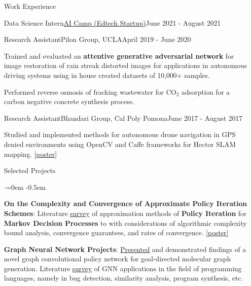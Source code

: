 \documentclass{resume}
\begin{document}
\begin{rSection}{Work Experience}
\begin{rSubsection}{Data Science Intern}{\href{https://www.ai-camp.org/}{AI Camp (Edtech Startup)}}{June 2021 - August 2021}
    \end{rSubsection}
    \begin{rSubsection}{Research Assistant}{Pilon Group, UCLA}{April 2019 - June 2020}
        \item Trained and evaluated an \textbf{attentive generative adversarial network} for image restoration of rain streak distorted
        images for applications in autonomous driving systems using in house created datasets of 10,000+ samples.
        \item Performed reverse osmosis of fracking wastewater for $\text{CO}_2$ adsorption for a carbon negative concrete synthesis process.
    \end{rSubsection}
    \begin{rSubsection}{Research Assistant}{\small Bhandari Group, Cal Poly Pomona}{June 2017 - August 2017}
        \item Studied and implemented methods for autonomous drone navigation in GPS denied environments using OpenCV and Caffe frameworks for Hector SLAM mapping.
        \href{https://docs.google.com/presentation/d/1fp-MPZUgKS_PhMD90d4aL0Rh0-YfghnEYHb3sHKmnGE/edit?usp=sharing}{[poster]}
    \end{rSubsection}
\end{rSection}

\begin{rSection}{Selected Projects}
    \vspace{0.5em}
    \begin{list}{$\cdot$}{\leftmargin=0em}
      \itemsep -0.5em \vspace{-0.5em}
        \item {\bf On the Complexity and Convergence of Approximate Policy Iteration Schemes}:
        Literature \href{https://github.com/joostinyi/ECE239AS/blob/master/RL_S20.pdf}{survey} of approximation methods of \textbf{Policy Iteration}
        for \textbf{Markov Decision Processes} to with considerations of algorithmic complexity bound analysis, convergence guarantees, and rates of convergence. 
        \href{https://github.com/joostinyi/ECE239AS/blob/master/Approximate-Policy-Iteration-Poster.pdf}{[poster]}
        \item {\bf Graph Neural Network Projects}:
        \href{https://github.com/yichousun/Winter2021_CS249_GNN/tree/main/Paper_Presentation/Graph_Synthesis/GCPN}{Presented} and demonstrated findings of a novel graph convolutional policy network for goal-directed molecular graph generation.
        Literature \href{https://github.com/Sripathm2/GNNSurvey}{survey} of GNN applications in the field of programming languages, namely in bug detection, similarity analysis, program synthesis, etc.
    \end{list}
    \end{rSection}
\end{document}
